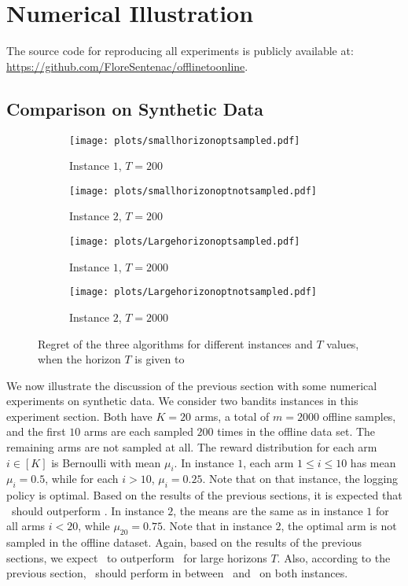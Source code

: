 \section{Numerical Illustration}

The source code for reproducing all experiments is publicly available at: \url{https://github.com/FloreSentenac/offlinetoonline}.
\subsection{Comparison on Synthetic Data}
\begin{figure}[htb]
\centering
\begin{subfigure}{.48\textwidth}
  \texttt{[image: plots/smallhorizonoptsampled.pdf]}
  \caption{Instance $1$, $T=200$}
  \label{fig:smallhorizonoptsampled}
\end{subfigure}\hfill
\begin{subfigure}{.48\textwidth}
  \texttt{[image: plots/smallhorizonoptnotsampled.pdf]}
  \caption{Instance $2$, $T=200$}
  \label{fig:smallhorizonoptnotsampled}
\end{subfigure}
\begin{subfigure}{.48\textwidth}
  \texttt{[image: plots/Largehorizonoptsampled.pdf]}
  \caption{Instance $1$, $T=2000$}
  \label{fig:Largehorizonoptsampled}
\end{subfigure}\hfill
\begin{subfigure}{.48\textwidth}
  \texttt{[image: plots/Largehorizonoptnotsampled.pdf]}
  \caption{Instance $2$, $T=2000$}
  \label{fig:LargehorizonoptnotsampledTknown}
\end{subfigure}
\caption{Regret of the three algorithms for different instances and $T$ values, when the horizon $T$ is given to \algoname}
\label{fig:firstsetexp}
\end{figure}

We now illustrate the discussion of the previous section with some numerical experiments on synthetic data.  We consider two bandits instances in this experiment section. Both have $K=20$ arms, a total of $m=2000$ offline samples, and the first $10$ arms are each sampled $200$ times in the offline data set.  The remaining arms are not sampled at all. The reward distribution for each arm $i\in [K]$ is Bernoulli with mean $\mu_i$. In instance $1$, each arm $1\leq i\leq 10$ has mean $\mu_i=0.5$, while for each $i >10$, $\mu_i=0.25$. Note that on that instance, the logging policy is optimal. Based on the results of the previous sections, it is expected that \alglcb\ should outperform \algucb. In instance $2$, the means are the same as in instance $1$ for all arms $i<20$, while $\mu_{20}=0.75$. Note that in instance $2$, the optimal arm is not sampled in the offline dataset. Again, based on the results of the previous sections, we expect \algucb\ to outperform \alglcb\ for large horizons $T$. Also, according to the previous section, \algoname\ should perform in between \alglcb\ and \algucb\ on both instances.

